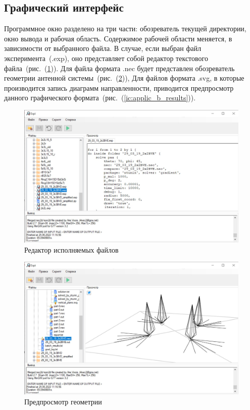 \subsection*{Графический интерфейс}
  Программное окно разделено на три части: обозреватель текущей директории, окно вывода и рабочая область. Содержимое рабочей области меняется, в зависимости от выбранного файла. В случае, если выбран файл эксперимента~(.exp), оно представляет собой редактор текстового файла~(рис.~(\ref{ic:applic_b_edit})). Для файла формата .nec будет представлен обозреватель геометрии антенной системы~(рис.~(\ref{ic:applic_b_preview})), Для файлов формата .svg, в которые производится запись диаграмм направленности, приводится предпросмотр данного графического формата~(рис.~(\ref{ic:applic_b_results})).

\begin{figure}[h!]
  \centering
  \includegraphics[width=\linewidth]{expi_script.jpeg}
  \caption{Редактор исполняемых файлов}
  \label{ic:applic_b_edit}
\end{figure}

\begin{figure}[h!]
  \centering
  \includegraphics[width=\linewidth]{expi_paa.jpeg}
  \caption{Предпросмотр геометрии}
  \label{ic:applic_b_preview}
\end{figure}

